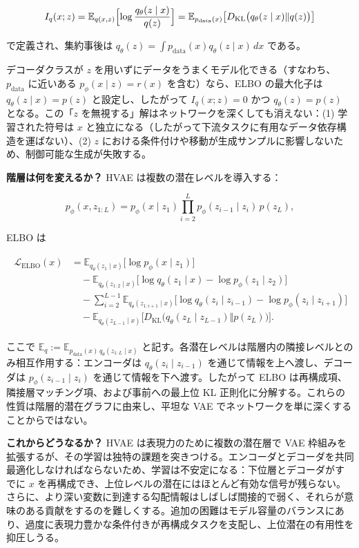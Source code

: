\[
I_q(x; z)
= \mathbb{E}_{q(x,z)}\Bigl[\log \frac{q_\theta(z\mid x)}{q(z)}\Bigr]
= \mathbb{E}_{p_{\mathrm{data}}(x)}\bigl[D_{\mathrm{KL}}\bigl(q_\theta(z\mid x)\Vert q(z)\bigr)\bigr]
\]


で定義され、集約事後は $q_\theta(z) = \int p_{\mathrm{data}}(x)q_\theta(z\mid x)\, dx$ である。

デコーダクラスが $z$ を用いずにデータをうまくモデル化できる（すなわち、$p_{\mathrm{data}}$ に近いある $p_\phi(x\mid z) = r(x)$ を含む）なら、ELBO の最大化子は $q_\theta(z\mid x) = p(z)$ と設定し、したがって $I_q(x; z) = 0$ かつ $q_\theta(z) = p(z)$ となる。この「$z$ を無視する」解はネットワークを深くしても消えない：(1) 学習された符号は $x$ と独立になる（したがって下流タスクに有用なデータ依存構造を運ばない）、(2) $z$ における条件付けや移動が生成サンプルに影響しないため、制御可能な生成が失敗する。

\textbf{階層は何を変えるか？} HVAE は複数の潜在レベルを導入する：

\[
p_\phi(x, z_{1:L})
= p_\phi(x\mid z_1)\prod_{i=2}^{L} p_\phi(z_{i-1}\mid z_i)\, p(z_L),
\]


ELBO は

\begin{align*}
\begin{aligned}
\mathcal{L}_{\mathrm{ELBO}}(x)
&= \mathbb{E}_{q_\theta(z_1\mid x)}\bigl[\log p_\phi(x\mid z_1)\bigr] \\
&\quad - \mathbb{E}_{q_\theta(z_{1:2}\mid x)}\bigl[\log q_\theta(z_1\mid x) - \log p_\phi(z_1\mid z_2)\bigr] \\
&\quad - \sum_{i=2}^{L-1}
\mathbb{E}_{q_\theta(z_{1:i+1}\mid x)}\bigl[\log q_\theta(z_i\mid z_{i-1}) - \log p_\phi(z_i\mid z_{i+1})\bigr] \\
&\quad - \mathbb{E}_{q_\theta(z_{L-1}\mid x)}\bigl[D_{\mathrm{KL}}\bigl(q_\theta(z_L\mid z_{L-1})\Vert p(z_L)\bigr)\bigr].
\end{aligned}
\end{align*}


ここで $\mathbb{E}_q := \mathbb{E}_{p_{\mathrm{data}}(x)\, q_\theta(z_{1:L}\mid x)}$ と記す。各潜在レベルは階層内の隣接レベルとのみ相互作用する：エンコーダは $q_\theta(z_i\mid z_{i-1})$ を通じて情報を上へ渡し、デコーダは $p_\phi(z_{i-1}\mid z_i)$ を通じて情報を下へ渡す。したがって ELBO は再構成項、隣接層マッチング項、および事前への最上位 KL 正則化に分解する。これらの性質は階層的潜在グラフに由来し、平坦な VAE でネットワークを単に深くすることからではない。

\textbf{これからどうなるか？} HVAE は表現力のために複数の潜在層で VAE 枠組みを拡張するが、その学習は独特の課題を突きつける。エンコーダとデコーダを共同最適化しなければならないため、学習は不安定になる：下位層とデコーダがすでに $x$ を再構成でき、上位レベルの潜在にはほとんど有効な信号が残らない。さらに、より深い変数に到達する勾配情報はしばしば間接的で弱く、それらが意味のある貢献をするのを難しくする。追加の困難はモデル容量のバランスにあり、過度に表現力豊かな条件付きが再構成タスクを支配し、上位潜在の有用性を抑圧しうる。


